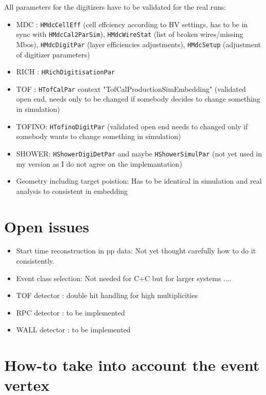 All parameters for the digitizers have to be validated for the real runs:
\begin{itemize}
    \item MDC : \verb+HMdcCellEff+ (cell effciency according to HV settings, 
    has to be in sync with 
    \newline
    \verb+HMdcCal2ParSim+), \verb+HMdcWireStat+ 
    (list of broken wires/missing Mbos), \verb+HMdcDigitPar+ (layer 
    efficiencies adjustments), \verb+HMdcSetup+ (adjustment of digitizer 
    parameters)
    \item RICH : \verb+HRichDigitisationPar+
    \item TOF : \verb+HTofCalPar+ context "TofCalProductionSimEmbedding" 
    (validated open end, needs only to be changed if somebody decides 
    to change something in simulation)
    \item TOFINO: \verb+HTofinoDigitPar+ (validated open end needs to 
    changed only if somebody wants to change something in simulation)
    \item SHOWER: \verb+HShowerDigiDetPar+ and maybe \verb+HShowerSimulPar+ 
    (not yet used in my version as I do not agree on the implemantation)
    \item Geometry including target poistion: Has to be identical in 
    simulation and real analysis to consistent in embedding

\end{itemize}

\section{Open issues}

\begin{itemize}
     \item Start time reconstruction in pp data: Not yet thought carefully 
     how to do it consistently.
    \item Event class selection: Not needed for C+C but for larger systems ....
    \item TOF detector : double hit handling for high multiplicities
    \item RPC detector : to be implemented
    \item WALL detector : to be implemented
\end{itemize}         

\section{How-to take into account the event vertex}

